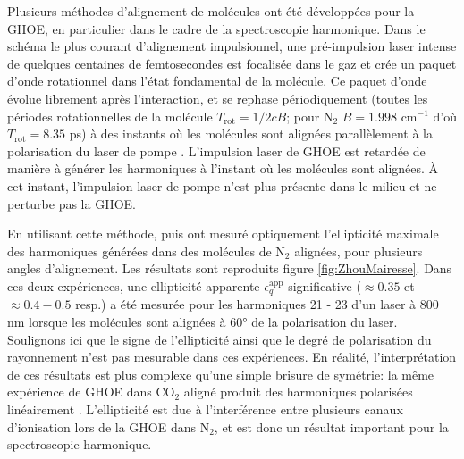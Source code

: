 Plusieurs méthodes d'alignement de molécules ont été développées pour la GHOE, en particulier dans le cadre de la spectroscopie harmonique. Dans le schéma le plus courant d'alignement impulsionnel, une pré-impulsion laser intense de quelques centaines de femtosecondes est focalisée dans le gaz et crée un paquet d'onde rotationnel dans l'état fondamental de la molécule. Ce paquet d'onde évolue librement après l'interaction, et se rephase périodiquement (toutes les périodes rotationnelles de la molécule $T_{\text{rot}} = 1/2cB$; pour N$_2$ $B = 1.998$ cm$^{-1}$ d'où $T_{\text{rot}} = 8.35$ ps) à des instants où les molécules sont alignées parallèlement à la polarisation du laser de pompe . L'impulsion laser de GHOE est retardée de manière à générer les harmoniques à l'instant où les molécules sont alignées. \`{A} cet instant, l'impulsion laser de pompe n'est plus présente dans le milieu et ne perturbe pas la GHOE.

En utilisant cette méthode,  puis  ont mesuré optiquement l'ellipticité maximale des harmoniques générées dans des molécules de N$_2$ alignées, pour plusieurs angles d'alignement. Les résultats sont reproduits figure \ref{fig:ZhouMairesse}. Dans ces deux expériences, une ellipticité apparente $\epsilon_q^{\text{app}}$ significative ($\approx 0.35$ et $\approx 0.4 - 0.5$ resp.) a été mesurée pour les harmoniques 21 - 23 d'un laser à 800 nm lorsque les molécules sont alignées à 60° de la polarisation du laser. Soulignons ici que le signe de l'ellipticité ainsi que le degré de polarisation du rayonnement n'est pas mesurable dans ces expériences. En réalité, l'interprétation de ces résultats est plus complexe qu'une simple brisure de symétrie: la même expérience de GHOE dans CO$_2$ aligné produit des harmoniques polarisées linéairement . L'ellipticité est due à l'interférence entre plusieurs canaux d'ionisation lors de la GHOE dans N$_2$, et est donc un résultat important pour la spectroscopie harmonique.

